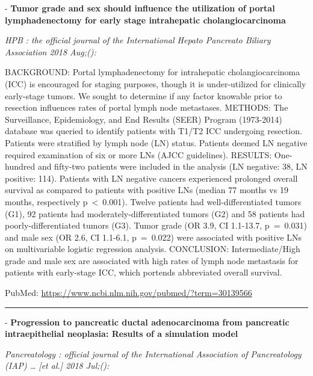 \documentclass[]{article}
\begin{document}
 - \textbf{Tumor grade and sex should influence the utilization of
portal lymphadenectomy for early stage intrahepatic cholangiocarcinoma}

\emph{HPB : the official journal of the International Hepato Pancreato
Biliary Association 2018 Aug;():}

BACKGROUND: Portal lymphadenectomy for intrahepatic cholangiocarcinoma
(ICC) is encouraged for staging purposes, though it is under-utilized
for clinically early-stage tumors. We sought to determine if any factor
knowable prior to resection influences rates of portal lymph node
metastases. METHODS: The Surveillance, Epidemiology, and End Results
(SEER) Program (1973-2014) database was queried to identify patients
with T1/T2 ICC undergoing resection. Patients were stratified by lymph
node (LN) status. Patients deemed LN negative required examination of
six or more LNs (AJCC guidelines). RESULTS: One-hundred and fifty-two
patients were included in the analysis (LN negative: 38, LN positive:
114). Patients with LN negative cancers experienced prolonged overall
survival as compared to patients with positive LNs (median 77 months vs
19 months, respectively p~\textless{}~0.001). Twelve patients had
well-differentiated tumors (G1), 92 patients had
moderately-differentiated tumors (G2) and 58 patients had
poorly-differentiated tumors (G3). Tumor grade (OR 3.9, CI 1.1-13.7,
p~=~0.031) and male sex (OR 2.6, CI 1.1-6.1, p~=~0.022) were associated
with positive LNs on multivariable logistic regression analysis.
CONCLUSION: Intermediate/High grade and male sex are associated with
high rates of lymph node metastasis for patients with early-stage ICC,
which portends abbreviated overall survival.

PubMed: \url{https://www.ncbi.nlm.nih.gov/pubmed/?term=30139566}

{}

{}

\begin{center}\rule{0.5\linewidth}{\linethickness}\end{center}

 - \textbf{Progression to pancreatic ductal adenocarcinoma from
pancreatic intraepithelial neoplasia: Results of a simulation model}

\emph{Pancreatology : official journal of the International Association
of Pancreatology (IAP) \ldots{} {[}et al.{]} 2018 Jul;():}
\end{document}
